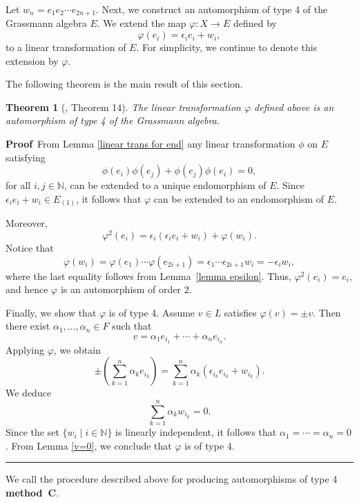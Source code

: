 \documentclass{article}
\newtheorem{theorem}{Theorem}
\newenvironment{proof}[1][Proof]{\noindent\textbf{#1\,} }{\hfill \rule{0.5em}{0.5em}\medskip}
\begin{document}
	
	
	
	Let $w_{n} = e_{1}e_{2} \cdots e_{2n+1}$.  Next, we construct an automorphism of type 4 of the Grassmann algebra $E$.  
	We extend the map $\varphi \colon X \to E$ defined by
	\[
	\varphi(e_{i}) = \epsilon_{i} e_{i} + w_{i},
	\]
	to a linear transformation of $E$. For simplicity, we continue to denote this extension by $\varphi$.
	
	
	
	
	
	
	The following theorem is the main result of this section.
	
	\begin{theorem}[\cite{anagomes}, Theorem 14]
		The linear transformation $\varphi$ defined above is an automorphism of type 4 of the Grassmann algebra.
	\end{theorem}
	
	\begin{proof}
		From Lemma \ref{linear trans for end} any linear transformation $\phi$ on $E$ satisfying
		\[
		\phi(e_i)\phi(e_j) + \phi(e_j)\phi(e_i) = 0,
		\]
		for all $i, j \in \mathbb{N}$, can be extended to a unique endomorphism of $E$.  
		Since $\epsilon_{i} e_{i} + w_{i} \in E_{(1)}$, it follows that $\varphi$ can be extended to an endomorphism of $E$.  
		
		Moreover,
		\[
		\varphi^{2}(e_{i}) = \epsilon_{i}(\epsilon_{i} e_{i} + w_{i}) + \varphi(w_{i}).
		\]
		Notice that
		\[
		\varphi(w_{i}) = \varphi(e_{1}) \cdots \varphi(e_{2i+1})
		= \epsilon_{1} \cdots \epsilon_{2i+1} w_{i}
		= -\epsilon_{i} w_{i},
		\]
		where the last equality follows from Lemma~\ref{lemma epsilon}.  
		Thus, $\varphi^{2}(e_{i}) = e_{i}$, and hence $\varphi$ is an automorphism of order $2$.
		
		Finally, we show that $\varphi$ is of type 4.  
		Assume $v \in L$ satisfies $\varphi(v) = \pm v$.  
		Then there exist $\alpha_{1}, \ldots, \alpha_{n} \in F$ such that
		\[
		v = \alpha_{1} e_{i_1} + \cdots + \alpha_{n} e_{i_n}.
		\]
		Applying $\varphi$, we obtain
		\[
		\pm \left( \sum_{k=1}^{n} \alpha_{k} e_{i_k} \right)
		= \sum_{k=1}^{n} \alpha_{k} \left( \epsilon_{i_k} e_{i_k} + w_{i_k} \right).
		\]
		We deduce
		\[
		\sum_{k=1}^{n} \alpha_{k} w_{i_k} = 0.
		\]
		Since the set $\{ w_i \mid i \in \mathbb{N} \}$ is linearly independent, it follows that $\alpha_{1} = \cdots = \alpha_{n} = 0$.  
		From Lemma \ref{v=0}, we conclude that $\varphi$ is of type 4.
	\end{proof}
	
	We call the procedure described above for producing automorphisms of type 4 \textbf{method~C}.
	
\end{document}
